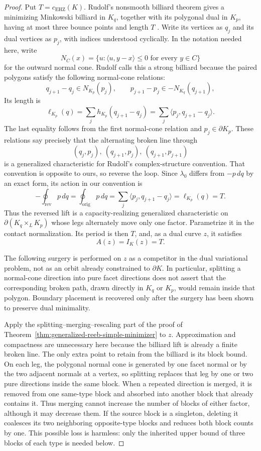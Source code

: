 \begin{proof}
Put \(T=c_{\mathrm{EHZ}}(K)\). Rudolf's nonsmooth billiard theorem gives a
minimizing Minkowski billiard in \(K_q\), together with its polygonal
dual in \(K_p\), having at most three bounce points and length \(T\)
\cite[Theorem~1]{Rudolf2022}. Write its vertices as \(q_j\) and its dual
vertices as \(p_j\), with indices understood cyclically.  In the notation
needed here, write
\[
  N_C(x)=\{u:\langle u,y-x\rangle\leq0\text{ for every }y\in C\}
\]
for the outward normal cone. Rudolf calls this a strong billiard because
the paired polygons satisfy the following normal-cone relations:
\[
  q_{j+1}-q_j\in N_{K_p}(p_j),
  \qquad
  p_{j+1}-p_j\in-N_{K_q}(q_{j+1}),
\]
Its length is
\[
  \ell_{K_p}(q)
  =\sum_j h_{K_p}(q_{j+1}-q_j)
  =\sum_j\langle p_j,q_{j+1}-q_j\rangle.
\]
The last equality follows from the first normal-cone relation and
\(p_j\in\partial K_p\). These relations say precisely
that the alternating broken line through
\[
  (q_j,p_j),\ (q_{j+1},p_j),\ (q_{j+1},p_{j+1})
\]
is a generalized characteristic for Rudolf's complex-structure convention.
That convention is opposite to ours, so reverse the loop. Since \(\lambda_0\)
differs from \(-p\,dq\) by an exact form, its action in our convention is
\[
  -\oint_{\mathrm{rev}}p\,dq
  =\oint_{\mathrm{orig}}p\,dq
  =\sum_j\langle p_j,q_{j+1}-q_j\rangle
  =\ell_{K_p}(q)=T.
\]
Thus the reversed lift is a capacity-realizing generalized characteristic on
\(\partial(K_q\times_L K_p)\) whose legs alternately move only one factor.
Parametrize it in the contact normalization. Its period is then \(T\), and, as
a dual curve \(z\), it satisfies
\[
  A(z)=I_K(z)=T.
\]

The following surgery is performed on \(z\) as a competitor in the dual
variational problem, not as an orbit already constrained to \(\partial K\).
In particular, splitting a normal-cone direction into pure facet directions
does not assert that the corresponding broken path, drawn directly in
\(K_q\) or \(K_p\), would remain inside that polygon.  Boundary placement is
recovered only after the surgery has been shown to preserve dual minimality.

Apply the splitting--merging--rescaling part of the proof of
Theorem~\ref{thm:generalized-reeb-simple-minimizer} to \(z\). Approximation and
compactness are unnecessary here because the billiard lift is already a finite
broken line. The only extra point to retain from the billiard is its block
bound. On each leg, the polygonal normal cone is generated by one facet normal
or by the two adjacent normals at a vertex, so splitting replaces that leg by
one or two pure directions inside the same block. When a repeated direction is
merged, it is removed from one same-type block and absorbed into another block
that already contains it.  Thus merging cannot increase the number of blocks
of either factor, although it may decrease them.  If the source block is a
singleton, deleting it coalesces its two neighboring opposite-type blocks and
reduces both block counts by one.  This possible loss is harmless: only the
inherited upper bound of three blocks of each type is needed below.


\end{proof}
